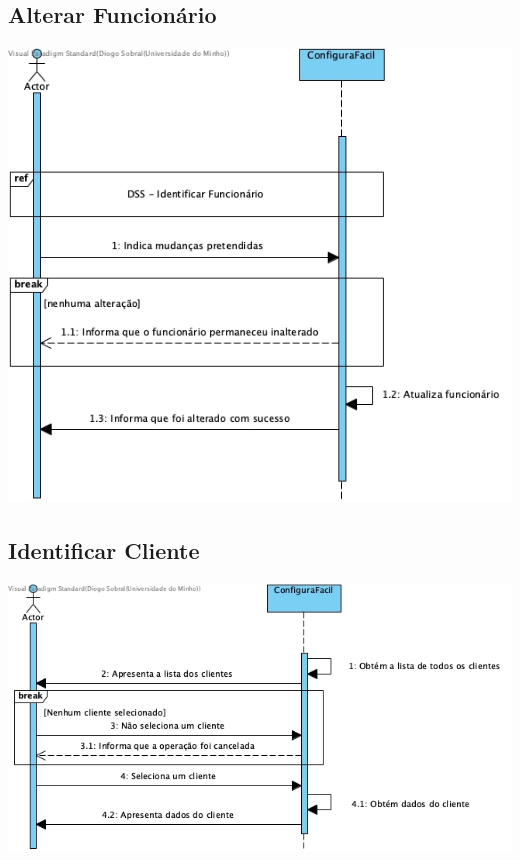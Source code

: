 \subsection{Alterar Funcionário}
\begin{center}
 	\includegraphics[width = 5.5in]{DSS/DSS-Alterar_funcionario.jpg}
\end{center}

\subsection{Identificar Cliente}
\begin{center}
 	\includegraphics[width = 5.5in]{DSS/DSS-Identificar_Cliente.jpg}
\end{center}

